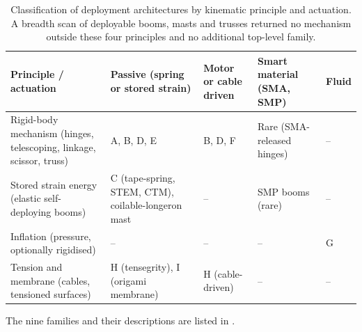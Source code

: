 \begin{table}[H]
    \centering
    \caption{Classification of deployment architectures by kinematic principle and actuation. A breadth scan of deployable booms, masts and trusses returned no mechanism outside these four principles and no additional top-level family.}
    \label{tab:families}
    \small
    \begin{tabularx}{\textwidth}{Xp{2.7cm}p{2.7cm}p{2.7cm}p{0.7cm}}
        \toprule
        Principle / actuation & Passive (spring or stored strain) & Motor or cable driven & Smart material (SMA, SMP) & Fluid \\
        \midrule
        Rigid-body mechanism (hinges, telescoping, linkage, scissor, truss) & A, B, D, E & B, D, F & Rare (SMA-released hinges) & -- \\
        \addlinespace
        Stored strain energy (elastic self-deploying booms) & C (tape-spring, STEM, CTM), coilable-longeron mast & -- & SMP booms (rare) & -- \\
        \addlinespace
        Inflation (pressure, optionally rigidised) & -- & -- & -- & G \\
        Tension and membrane (cables, tensioned surfaces) & H (tensegrity), I (origami membrane) & H (cable-driven) & -- & -- \\
        \bottomrule
    \end{tabularx}
\end{table}

The nine families and their descriptions are listed in .

